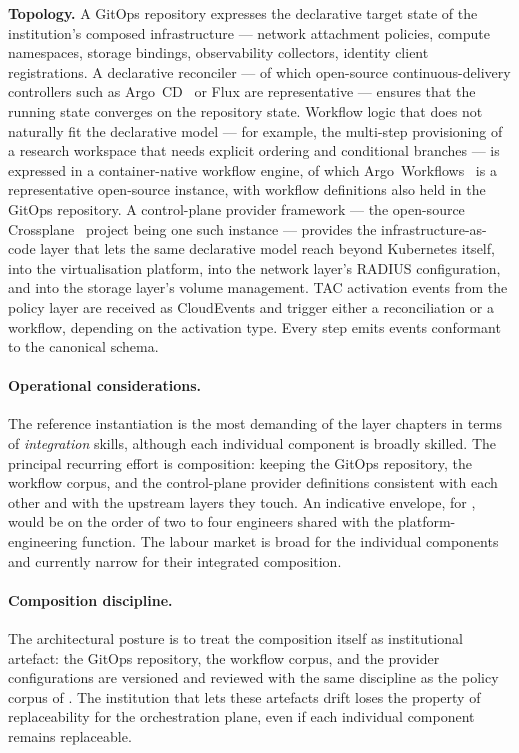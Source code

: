 \begin{instantiationbox}
\noindent\textbf{Topology.} A GitOps repository expresses the
declarative target state of the institution's composed
infrastructure --- network attachment policies, compute namespaces,
storage bindings, observability collectors, identity client
registrations. A declarative reconciler --- of which open-source
continuous-delivery controllers such as Argo~CD~\cite{argocd} or
Flux are representative --- ensures that the running state converges
on the repository state. Workflow logic that does not naturally fit
the declarative model --- for example, the multi-step provisioning
of a research workspace that needs explicit ordering and conditional
branches --- is expressed in a container-native workflow engine, of
which Argo~Workflows~\cite{argo-workflows} is a representative
open-source instance, with workflow definitions also held in the
GitOps repository. A control-plane provider framework --- the
open-source Crossplane~\cite{crossplane} project being one such
instance --- provides the infrastructure-as-code layer that lets the
same declarative model reach beyond Kubernetes itself, into the
virtualisation platform, into the network layer's RADIUS
configuration, and into the storage layer's volume management. TAC
activation events from the policy layer are received as
CloudEvents and trigger either a reconciliation or a workflow,
depending on the activation type. Every step emits events
conformant to the canonical schema.
\end{instantiationbox}

\paragraph{Operational considerations.} The reference instantiation
is the most demanding of the layer chapters in terms of
\emph{integration} skills, although each individual component is
broadly skilled. The principal recurring effort is composition:
keeping the GitOps repository, the workflow corpus, and the
control-plane provider definitions consistent with each other and
with the upstream layers they touch. An indicative envelope, for , would be on the order of two to four engineers shared
with the platform-engineering function. The labour market is broad
for the individual components and currently narrow for their
integrated composition.

\paragraph{Composition discipline.} The architectural posture is to
treat the composition itself as institutional artefact: the GitOps
repository, the workflow corpus, and the provider configurations
are versioned and reviewed with the same discipline as the policy
corpus of . The institution that lets these
artefacts drift loses the property of replaceability for the
orchestration plane, even if each individual component remains
replaceable.

